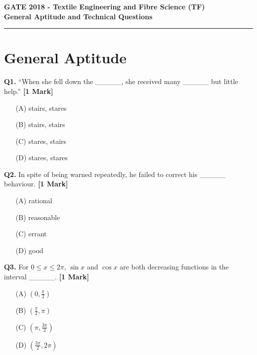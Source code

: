 \documentclass[11pt]{article}
\newcommand{\questiona}[2]{
    \noindent\textbf{Q#2.} #1 \hfill \textbf{[1 Mark]}
}
\begin{document}
\begin{center}
    \Large\textbf{GATE 2018 - Textile Engineering and Fibre Science (TF)} \\
    \large\textbf{General Aptitude and Technical Questions} \\
    \rule{\textwidth}{0.5pt} %
\end{center}

\vspace{0.5cm}

\section*{General Aptitude}

\questiona{“When she fell down the \_\_\_\_\_, she received many \_\_\_\_\_ but little help.”}{1}
\begin{enumerate}
    \item[(A)] stairs, stares
    \item[(B)] stairs, stairs
    \item[(C)] stares, stairs
    \item[(D)] stares, stares
\end{enumerate}
\vspace{0.5cm}

\questiona{In spite of being warned repeatedly, he failed to correct his \_\_\_\_\_ behaviour.}{2}
\begin{enumerate}
    \item[(A)] rational
    \item[(B)] reasonable
    \item[(C)] errant
    \item[(D)] good
\end{enumerate}
\vspace{0.5cm}

\questiona{For \(0 \leq x \leq 2\pi\), \(\sin x\) and \(\cos x\) are both decreasing functions in the interval \_\_\_\_\_.}{3}
\begin{enumerate}
    \item[(A)] \( (0, \frac{\pi}{2}) \)
    \item[(B)] \( (\frac{\pi}{2}, \pi) \)
    \item[(C)] \( (\pi, \frac{3\pi}{2}) \)
    \item[(D)] \( (\frac{3\pi}{2}, 2\pi) \)
\end{enumerate}
\vspace{0.5cm}
\end{document}
